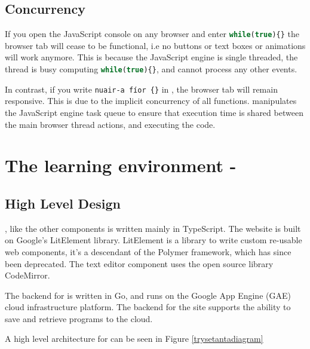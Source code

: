 \subsection{Concurrency}

If you open the JavaScript console on any browser and enter \lstinline[language=javascript]|while(true){}| the browser tab will cease to be functional, i.e no buttons or text boxes or animations will work anymore. This is because the JavaScript engine is single threaded, the thread is busy computing \lstinline[language=javascript]|while(true){}|, and cannot process any other events.

In contrast, if you write \lstinline[language=setanta]|nuair-a fíor {}| in \Setanta{}, the browser tab will remain responsive. This is due to the implicit concurrency of all \Setanta{} functions. \Setanta{} manipulates the JavaScript engine task queue to ensure that execution time is shared between the main browser thread actions, and executing the \Setanta{} code.

\section{The learning environment - \trys{}}

\subsection{High Level Design}

\trys{}, like the other components is written mainly in TypeScript. The website is built on Google's LitElement library. LitElement is a library to write custom re-usable web components, it's a descendant of the Polymer framework, which has since been deprecated. The text editor component uses the open source library CodeMirror.

The backend for \trys{} is written in Go, and runs on the Google App Engine (GAE) cloud infrastructure platform. The backend for the site supports the ability to save and retrieve \Setanta{} programs to the cloud.

A high level architecture for \trys{} can be seen in Figure \ref{trysetantadiagram}

